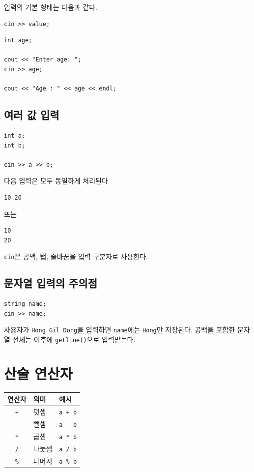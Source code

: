 \documentclass[11pt,a4paper]{article}
\begin{document}
입력의 기본 형태는 다음과 같다.

\begin{lstlisting}
cin >> value;
\end{lstlisting}

\begin{lstlisting}
int age;

cout << "Enter age: ";
cin >> age;

cout << "Age : " << age << endl;
\end{lstlisting}

\subsection{여러 값 입력}

\begin{lstlisting}
int a;
int b;

cin >> a >> b;
\end{lstlisting}

다음 입력은 모두 동일하게 처리된다.

\begin{verbatim}
10 20
\end{verbatim}

또는

\begin{verbatim}
10
20
\end{verbatim}

\texttt{cin}은 공백, 탭, 줄바꿈을 입력 구분자로 사용한다.

\subsection{문자열 입력의 주의점}

\begin{lstlisting}
string name;
cin >> name;
\end{lstlisting}

사용자가 \texttt{Hong Gil Dong}을 입력하면 \texttt{name}에는 \texttt{Hong}만 저장된다.
공백을 포함한 문자열 전체는 이후에 \texttt{getline()}으로 입력받는다.

\section{산술 연산자}

\begin{center}
\begin{tabular}{cll}
\toprule
연산자 & 의미 & 예시 \\
\midrule
\texttt{+} & 덧셈 & \texttt{a + b} \\
\texttt{-} & 뺄셈 & \texttt{a - b} \\
\texttt{*} & 곱셈 & \texttt{a * b} \\
\texttt{/} & 나눗셈 & \texttt{a / b} \\
\texttt{\%} & 나머지 & \texttt{a \% b} \\
\bottomrule
\end{tabular}
\end{center}
\end{document}
